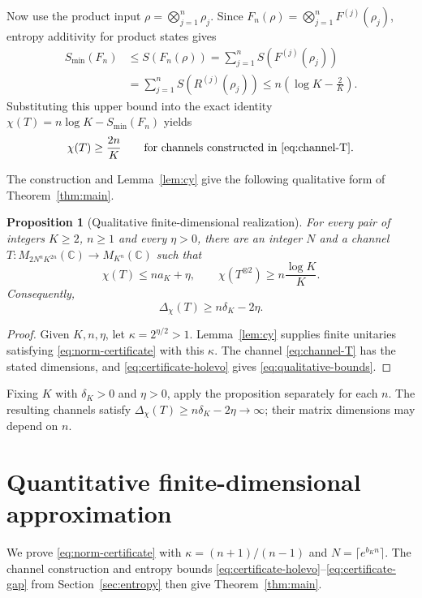 \documentclass[11pt]{article}
\numberwithin{equation}{section}
\newtheorem{proposition}[theorem]{Proposition}
\theoremstyle{boldremark}\newtheorem{remark}[theorem]{Remark}
\newcommand{\C}{\mathbb C}
\newcommand{\M}{M}
\newcommand{\smin}{S_{\min}}
\begin{document}
Now use the product input $\rho=\bigotimes_{j=1}^n\rho_j$.
Since $F_n(\rho)=\bigotimes_{j=1}^nF^{(j)}(\rho_j)$, entropy
additivity for product states gives
\[
 \begin{aligned}
 \smin(F_n)
 &\le S(F_n(\rho))
 =\sum_{j=1}^n S(F^{(j)}(\rho_j))\\
 &=\sum_{j=1}^n S(R^{(j)}(\rho_j))
 \le n\left(\log K-\frac2K\right).
 \end{aligned}
\]
Substituting this upper bound into the exact identity
$\chi(T)=n\log K-\smin(F_n)$ yields
\begin{equation}
 \chi(T)\ge\frac{2n}{K}
 \qquad\text{for channels constructed in \eqref{eq:channel-T}.}
 \label{eq:constructed-holevo-lower}
\end{equation}

The construction and Lemma~\ref{lem:cy} give the following qualitative
form of Theorem~\ref{thm:main}.

\begin{proposition}[Qualitative finite-dimensional realization]\label{prop:qualitative}
For every pair of integers $K\ge2$, $n\ge1$ and every $\eta>0$, there
are an integer $N$ and a channel
$T:\M_{2N^nK^{2n}}(\C)\to\M_{K^n}(\C)$ such that
\begin{equation}
 \chi(T)\le na_K+\eta,
 \qquad \chi(T^{\otimes2})\ge n\frac{\log K}{K}.
 \label{eq:qualitative-bounds}
\end{equation}
Consequently,
\[
 \Delta_\chi(T)\ge n\delta_K-2\eta.
\]
\end{proposition}
\begin{proof}
Given $K,n,\eta$, let $\kappa=2^{\eta/2}>1$.
Lemma~\ref{lem:cy} supplies finite unitaries satisfying
\eqref{eq:norm-certificate} with this $\kappa$.
The channel \eqref{eq:channel-T} has the stated dimensions, and
\eqref{eq:certificate-holevo} gives \eqref{eq:qualitative-bounds}.
\end{proof}

Fixing $K$ with $\delta_K>0$ and $\eta>0$, apply the proposition
separately for each $n$. The resulting channels satisfy
$\Delta_\chi(T)\ge n\delta_K-2\eta\to\infty$; their matrix dimensions
may depend on $n$.

\section{Quantitative finite-dimensional approximation}
\label{sec:approximation}

We prove \eqref{eq:norm-certificate} with $\kappa=(n+1)/(n-1)$ and
$N=\lceil e^{b_Kn}\rceil$. The channel construction and entropy bounds
\eqref{eq:certificate-holevo}--\eqref{eq:certificate-gap} from
Section~\ref{sec:entropy} then give Theorem~\ref{thm:main}.
\end{document}
